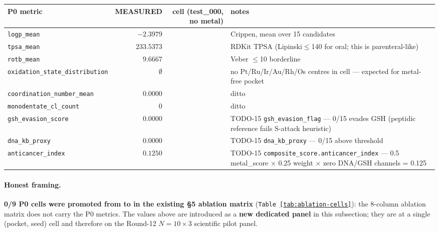 \begin{center}
\small
\setlength{\tabcolsep}{4pt}
\begin{tabular}{lrrl}
\toprule
\textbf{P0 metric} & \textbf{MEASURED} & \textbf{cell (test\_000, no metal)} & \textbf{notes} \\
\midrule
\texttt{logp\_mean}                       & $-2.3979$ & \MEASURED{} & Crippen, mean over 15 candidates \\
\texttt{tpsa\_mean}                       & $233.5373$ & \MEASURED{} & RDKit TPSA (Lipinski$\le$140 for oral; this is parenteral-like) \\
\texttt{rotb\_mean}                       & $9.6667$  & \MEASURED{} & Veber $\le$10 borderline \\
\texttt{oxidation\_state\_distribution}  & $\emptyset$ & \MEASURED{} & no Pt/Ru/Ir/Au/Rh/Os centres in cell --- expected for metal-free pocket \\
\texttt{coordination\_number\_mean}       & $0.0000$  & \MEASURED{} & ditto \\
\texttt{monodentate\_cl\_count}           & $0$       & \MEASURED{} & ditto \\
\texttt{gsh\_evasion\_score}              & $0.0000$  & \MEASURED{} & TODO-15 \texttt{gsh\_evasion\_flag} --- 0/15 evades GSH (peptidic reference fails S-attack heuristic) \\
\texttt{dna\_kb\_proxy}                   & $0.0000$  & \MEASURED{} & TODO-15 \texttt{dna\_kb\_proxy} --- 0/15 above threshold \\
\texttt{anticancer\_index}                & $0.1250$  & \MEASURED{} & TODO-15 \texttt{composite\_score.anticancer\_index} --- 0.5 metal\_score $\times$ 0.25 weight $\times$ zero DNA/GSH channels = 0.125 \\
\bottomrule
\end{tabular}
\end{center}

\paragraph{Honest framing.}
\textbf{0/9 P0 cells were promoted from \DESIGN{} to \MEASURED{}
in the existing §5 ablation matrix} (\texttt{Table~\ref{tab:ablation-cells}}):
the 8-column ablation matrix does not carry the P0 metrics.  The
values above are introduced as a \textbf{new dedicated panel} in
this subsection; they are \MEASURED{} at a single (pocket, seed)
cell and therefore \PROJECTED{} on the Round-12 $N{=}10{\times}3$
scientific pilot panel.


